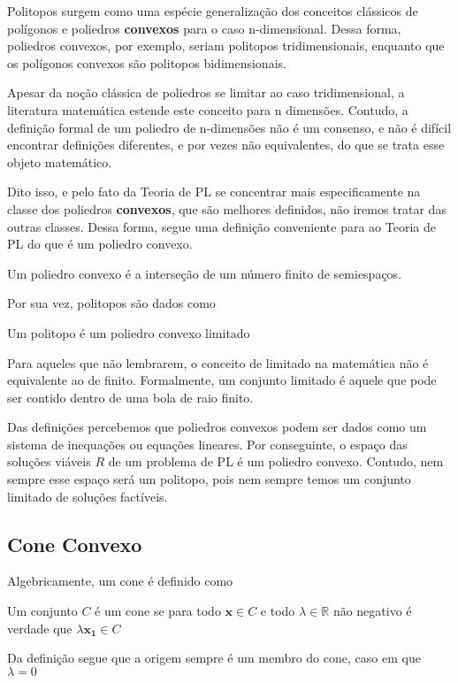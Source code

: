 Politopos surgem como uma espécie generalização dos conceitos clássicos de polígonos e poliedros \textbf{convexos} para o caso n-dimensional. Dessa forma, poliedros convexos, por exemplo, seriam politopos tridimensionais, enquanto que os polígonos convexos são politopos bidimensionais. 

Apesar da noção clássica de poliedros se limitar ao caso tridimensional, a literatura matemática estende este conceito para n dimensões. Contudo, a definição formal de um poliedro de n-dimensões não é um consenso, e não é difícil encontrar definições diferentes, e por vezes não equivalentes, do que se trata esse objeto matemático.

Dito isso, e pelo fato da Teoria de PL se concentrar mais especificamente na classe dos poliedros \textbf{convexos}, que são melhores definidos, não iremos tratar das outras classes. Dessa forma, segue uma definição conveniente para ao Teoria de PL do que é um poliedro convexo.

\begin{def:poliedro convexo}
	Um poliedro convexo é a interseção de um número finito de semiespaços.
\end{def:poliedro convexo}

Por sua vez, politopos são dados como

\begin{def:politopo}
	Um politopo é um poliedro convexo limitado
\end{def:politopo}

Para aqueles que não lembrarem, o conceito de limitado na matemática não é equivalente ao de finito. Formalmente, um conjunto limitado é aquele que pode ser contido dentro de uma bola de raio finito. 

Das definições percebemos que poliedros convexos podem ser dados como um sistema de inequações ou equações lineares. Por conseguinte, o espaço das soluções viáveis $R$ de um problema de PL é um poliedro convexo. Contudo, nem sempre esse espaço será um politopo, pois nem sempre temos um conjunto limitado de soluções factíveis.

\subsection{Cone Convexo}

Algebricamente, um cone é definido como

\begin{def:cone}
	Um conjunto $C$ é um cone se para todo $\mathbf{x} \in C$ e todo $\lambda \in \mathbb{R}$ não negativo é verdade que \(\lambda \mathbf{x_1} \in C\)
\end{def:cone}
Da definição segue que a origem sempre é um membro do cone, caso em que $\lambda = 0$

